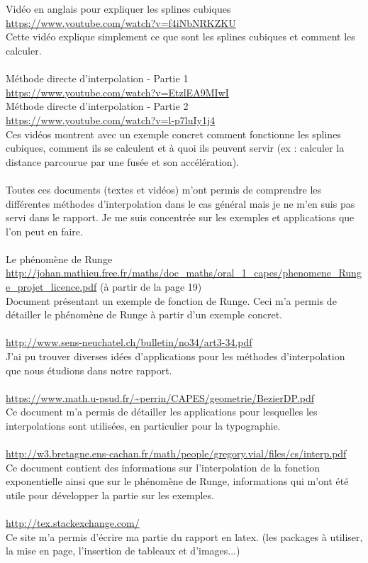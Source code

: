 \documentclass{article}
\begin{document}
\\\\
Vid\'eo en anglais pour expliquer les splines cubiques
\\
{\color{blue}
\url{https://www.youtube.com/watch?v=f4iNbNRKZKU}}
\\
Cette vid\'{e}o explique simplement ce que sont les splines cubiques et comment les calculer.
\\\\
M\'ethode directe d'interpolation - Partie 1
\\
{\color{blue}
\url{https://www.youtube.com/watch?v=EtzlEA9MIwI}} 
\\
M\'ethode directe d'interpolation - Partie 2
\\
{\color{blue}
\url{https://www.youtube.com/watch?v=l-p7luIy1j4}} 
\\
Ces vid\'eos montrent avec un exemple concret comment fonctionne les splines cubiques, comment ils se calculent et \`a quoi ils peuvent servir (ex : calculer la distance parcourue par une fus\'ee et son acc\'el\'eration).
\\\\
Toutes ces documents (textes et vid\'eos) m'ont permis de comprendre les diff\'erentes m\'ethodes d'interpolation dans le cas g\'en\'eral mais je ne m'en suis pas servi dans le rapport.
Je me suis concentr\'ee sur les exemples et applications que l'on peut en faire.
\\\\
Le ph\'enom\`ene de Runge
\\
{\color{blue}
\url{http://johan.mathieu.free.fr/maths/doc_maths/oral_1_capes/phenomene_Runge_projet_licence.pdf}} (\`a partir de la page 19)
\\
Document pr\'esentant un exemple de fonction de Runge. Ceci m'a permis de d\'etailler le ph\'enom\`ene de Runge \`a partir d'un exemple concret.
\\\\
{\color{blue}
\url{http://www.sens-neuchatel.ch/bulletin/no34/art3-34.pdf}}
\\
J'ai pu trouver diverses id\'ees d'applications pour les m\'ethodes d'interpolation que nous \'etudions dans notre rapport.
\\\\
{\color{blue}
\url{https://www.math.u-psud.fr/~perrin/CAPES/geometrie/BezierDP.pdf}} 
\\
Ce document m'a permis de d\'etailler les applications pour lesquelles les interpolations sont utilis\'ees, en particulier pour la typographie.
\\\\
{\color{blue}
\url{http://w3.bretagne.ens-cachan.fr/math/people/gregory.vial/files/cs/interp.pdf}}
\\
Ce document contient des informations sur l'interpolation de la fonction exponentielle ainsi que sur le ph\'enom\`ene de Runge, informations qui m'ont \'et\'e utile pour d\'evelopper la partie sur les exemples.
\\\\
\newpage
{\color{blue}
\url{http://tex.stackexchange.com/}}
\\
Ce site m'a permis d'\'ecrire ma partie du rapport en latex. (les packages \`a utiliser, la mise en page, l'insertion de tableaux et d'images...)
\end{document}
